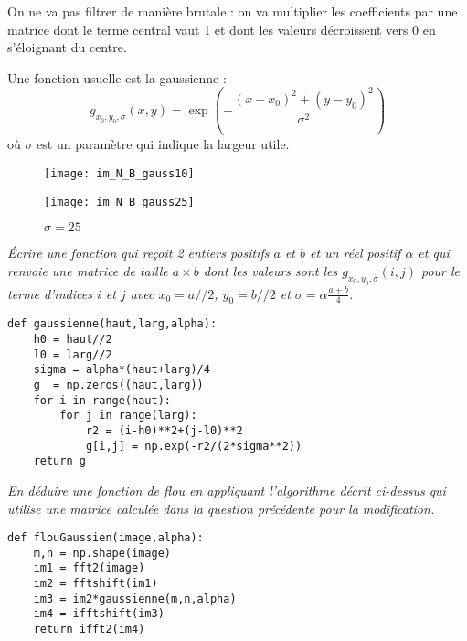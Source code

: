 On ne va pas filtrer de manière brutale : on va multiplier les coefficients par une matrice dont le terme central vaut 1 et dont les valeurs décroissent vers 0 en s'éloignant du centre. 

Une fonction usuelle est la gaussienne : 
\[g_{x_0,y_0,\sigma}(x,y) = \exp\left(-\frac{(x-x_0)^2+(y-y_0)^2}{\sigma^2}\right)\] où $\sigma$ est un paramètre qui indique la largeur utile.
\begin{figure}[!h]
\centering
\begin{minipage}{0.45\textwidth}
\centering
\texttt{[image: im\_N\_B\_gauss10]}
\caption*{$\sigma = 10$}
\end{minipage}\hfill
\begin{minipage}{0.45\textwidth}
\centering
\texttt{[image: im\_N\_B\_gauss25]}
\caption*{$\sigma = 25$}
\end{minipage}
\end{figure}
\begin{Exercise}[title=Gaussienne]\it Écrire une fonction  qui reçoit 2 entiers positifs 
$a$ et $b$ et un réel positif $\alpha$ et qui renvoie une matrice de taille $a\times b$ dont les valeurs sont les $g_{x_0,y_0,\sigma}(i,j)$ pour le terme d'indices $i$ et $j$ avec $x_0 = a//2$, $y_0 = b//2$ et $\sigma = \alpha \frac{a+b}4$.
\end{Exercise}
\begin{Answer} 
\begin{lstlisting}
def gaussienne(haut,larg,alpha):
    h0 = haut//2
    l0 = larg//2
    sigma = alpha*(haut+larg)/4
    g  = np.zeros((haut,larg))
    for i in range(haut):
        for j in range(larg):
            r2 = (i-h0)**2+(j-l0)**2
            g[i,j] = np.exp(-r2/(2*sigma**2))
    return g
\end{lstlisting}
\end{Answer}
\begin{Exercise}[title=Flou gaussien]\it En déduire une fonction de flou  en appliquant l'algorithme décrit ci-dessus qui utilise une matrice calculée dans la question précédente pour la modification.
\end{Exercise}
\begin{Answer}
\begin{lstlisting}
def flouGaussien(image,alpha):
    m,n = np.shape(image)
    im1 = fft2(image)
    im2 = fftshift(im1)
    im3 = im2*gaussienne(m,n,alpha)
    im4 = ifftshift(im3)
    return ifft2(im4)
\end{lstlisting}
\end{Answer}
